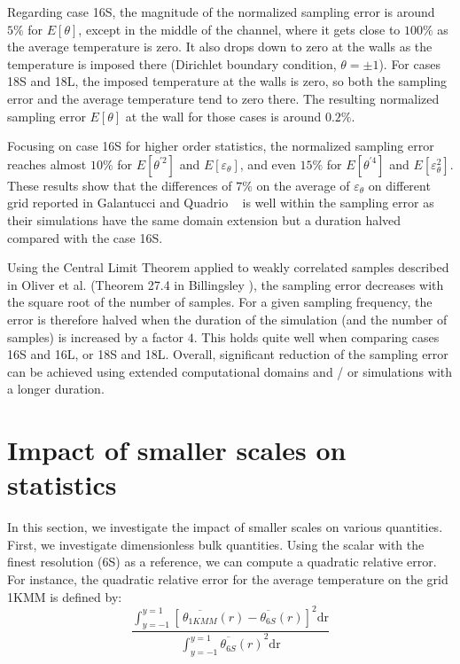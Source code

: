 \documentclass[review]{elsarticle}
\newcommand{\gqcite}{Galantucci and Quadrio \cite{galantucci2010very}}
\newcommand{\epst}{\varepsilon_\theta}
\begin{document}
Regarding case 16S, the magnitude of the normalized sampling error is around $5\%$ for $E\left[\theta\right]$, except in the middle of the channel, where it gets close to $100\%$ as the average temperature is zero. It also drops down to zero at the walls as the temperature is imposed there (Dirichlet boundary condition, $\theta = \pm 1$). For cases 18S and 18L, the imposed temperature at the walls is zero, so both the sampling error and the average temperature tend to zero there. The resulting normalized sampling error $E\left[\theta\right]$ at the wall for those cases is around $0.2\%$.

Focusing on case 16S for higher order statistics, the normalized sampling error reaches almost $10\%$ for $E\left[ \theta^{\prime2} \right]$ and $E\left[\epst\right]$, and even $15\%$ for $E\left[ \theta^{\prime4} \right]$ and $E\left[\epst^2\right]$. These results show that the differences of $7\%$ on the average of $\epst$ on different grid reported in \gqcite ~ is well within the sampling error as their simulations have the same domain extension but a duration halved compared with the case 16S.

Using the Central Limit Theorem applied to weakly correlated samples described in Oliver et al. \cite{oliver2014estimating} (Theorem 27.4 in Billingsley \cite{billingsley2008probability}), the sampling error decreases with the square root of the number of samples. For a given sampling frequency, the error is therefore halved when the duration of the simulation (and the number of samples) is increased by a factor $4$. This holds quite well when comparing cases 16S and 16L, or 18S and 18L. Overall, significant reduction of the sampling error can be achieved using extended computational domains and / or simulations with a longer duration.

\section{Impact of smaller scales on statistics}

In this section, we investigate the impact of smaller scales on various quantities. First, we investigate dimensionless bulk quantities. Using the scalar with the finest resolution (6S) as a reference, we can compute a quadratic relative error. For instance, the quadratic relative error for the average temperature on the grid 1KMM is defined by:
\begin{equation}
\frac{\int_{y=-1}^{y=1}\left[\,\overline{\theta_{1KMM}}\left(r\right) - \overline{\theta_{6S}}\left(r\right)\right]^2\mbox{dr}}{\int_{y=-1}^{y=1}{\overline{\theta_{6S}}\left(r\right)}^2\mbox{dr}}
\end{equation}
\end{document}
